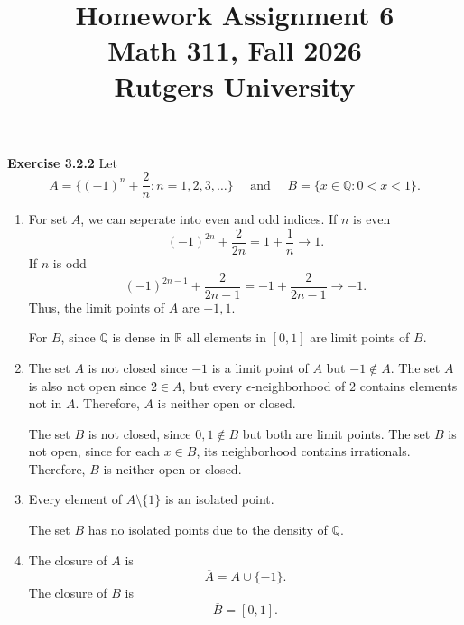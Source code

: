 \documentclass[12pt]{article}
\title{Homework Assignment 6 \\ \large Math 311, Fall 2026 \\ Rutgers University}
\author{}
\date{}
\begin{document}
\maketitle

\textbf{Exercise 3.2.2}
Let
\[
    A = \{ (-1)^n + \frac{2}{n} : n = 1, 2, 3, \dots \} \quad \text{ and } \quad  B = \{x \in \mathbb{Q} : 0 < x < 1 \}.
\]
\begin{enumerate}[label=(\alph*)]
    \item For set \( A \), we can seperate into even and odd indices.
          If \( n \) is even
          \[
              (-1)^{2n} + \frac{2}{2n} = 1 + \frac{1}{n} \to 1.
          \]
          If \( n \) is odd
          \[
              (-1)^{2n-1} + \frac{2}{2n-1} = -1 + \frac{2}{2n-1} \to -1.
          \]
          Thus, the limit points of \( A \) are \( -1, 1 \).

          For  \( B \), since \( \mathbb{Q} \) is dense in \( \mathbb{R} \)
          all elements in \( [0,1] \) are limit points of \( B \).

    \item The set \( A \) is not closed since \( -1 \) is a limit point of \( A \) but \( -1 \not \in A \).
          The set \( A \) is also not open since \( 2 \in A \), but every \( \epsilon \)-neighborhood of \( 2 \) contains elements not in \( A \).
          Therefore, \( A \) is neither open or closed.

          The set \( B \) is not closed, since \( 0,1 \not \in B \) but both are limit points.
          The set \( B \) is not open, since for each \( x \in B \), its neighborhood contains irrationals.
          Therefore, \( B \) is neither open or closed.

    \item Every element of \( A \setminus \{1\} \) is an isolated point.

          The set \( B \) has no isolated points due to the density of \( \mathbb{Q} \).

    \item The closure of \( A \) is
          \[
              \overline{A} = A \cup \{-1\}.
          \]
          The closure of \( B \) is
          \[
              \overline{B} = [0,1].
          \]
\end{enumerate}
\end{document}
